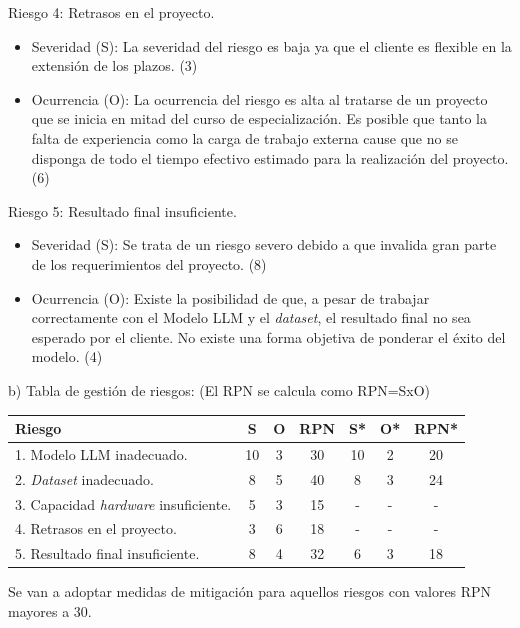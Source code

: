 \documentclass[
11pt, %
]{Clases/charter}
\begin{document}
Riesgo 4: Retrasos en el proyecto.
\begin{itemize}
	\item Severidad (S): La severidad del riesgo es baja ya que el cliente es flexible en la extensión de los plazos. (3)
	\item Ocurrencia (O): La ocurrencia del riesgo es alta al tratarse de un proyecto que se inicia en mitad del curso de especialización.
	      Es posible que tanto la falta de experiencia como la carga de trabajo externa cause que no se disponga de todo el tiempo efectivo estimado para la realización del proyecto. (6)
\end{itemize}

Riesgo 5: Resultado final insuficiente.
\begin{itemize}
	\item Severidad (S): Se trata de un riesgo severo debido a que invalida gran parte de los requerimientos del proyecto. (8)
	\item Ocurrencia (O): Existe la posibilidad de que, a pesar de trabajar correctamente con el Modelo LLM y el \textit{dataset}, el resultado final no sea esperado por el cliente.
	      No existe una forma objetiva de ponderar el éxito del modelo. (4)
\end{itemize}
b) Tabla de gestión de riesgos:      (El RPN se calcula como RPN=SxO)

\begin{table}[htpb]
	\centering
	\begin{tabularx}{\linewidth}{@{}|X|c|c|c|c|c|c|@{}}
		\hline
		\rowcolor[HTML]{C0C0C0}
		Riesgo                                       & S  & O & RPN & S* & O* & RPN* \\ \hline
		1. Modelo LLM inadecuado.                    & 10 & 3 & 30  & 10 & 2  & 20   \\ \hline
		2. \textit{Dataset} inadecuado.              & 8  & 5 & 40  & 8  & 3  & 24   \\ \hline
		3. Capacidad \textit{hardware} insuficiente. & 5  & 3 & 15  & -  & -  & -    \\ \hline
		4. Retrasos en el proyecto.                  & 3  & 6 & 18  & -  & -  & -    \\ \hline
		5. Resultado final insuficiente.             & 8  & 4 & 32  & 6  & 3  & 18   \\ \hline
	\end{tabularx}%
\end{table}

Se van a adoptar medidas de mitigación para aquellos riesgos con valores RPN mayores a 30.
\end{document}
